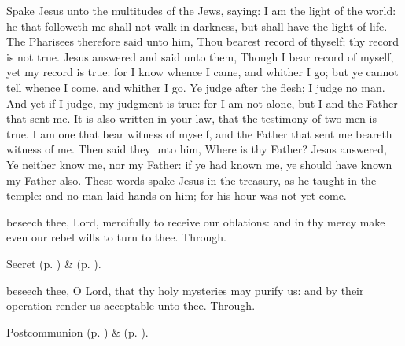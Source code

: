 
 Spake Jesus unto the multitudes of the Jews, saying: I am the light of the world: he that followeth me shall not walk in darkness, but shall have the light of life. The Pharisees therefore said unto him, Thou bearest record of thyself; thy record is not true. Jesus answered and said unto them, Though I bear record of myself, yet my record is true: for I know whence I came, and whither I go; but ye cannot tell whence I come, and whither I go. Ye judge after the flesh; I judge no man. And yet if I judge, my judgment is true: for I am not alone, but I and the Father that sent me. It is also written in your law, that the testimony of two men is true. I am one that bear witness of myself, and the Father that sent me beareth witness of me. Then said they unto him, Where is thy Father? Jesus answered, Ye neither know me, nor my Father: if ye had known me, ye should have known my Father also. These words spake Jesus in the treasury, as he taught in the temple: and no man laid hands on him; for his hour was not yet come.

\clearpage
{}

\secret
{} beseech thee, Lord, mercifully to receive our oblations: and in thy mercy make even our rebel wills to turn to thee. Through.


\begin{rubric}
     Secret  (p. \pageref{AshWednesdayMassSecret}) \&   (p. \pageref{SPLivingDeparted}).
\end{rubric}


\postcommunion
{} beseech thee, O Lord, that thy holy mysteries may purify us: and by their operation render us acceptable unto thee. Through.


\begin{rubric}
     Postcommunion  (p. \pageref{AshWednesdayMassPostcommunion}) \&   (p. \pageref{SPLivingDeparted}).
\end{rubric}

